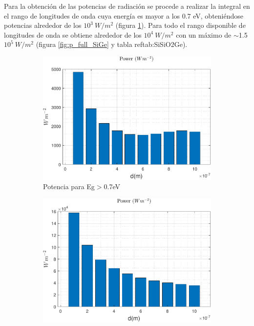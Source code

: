 Para la obtención de las potencias de radiación se procede a realizar la integral en el rango de longitudes de onda cuya energía es mayor a los 0.7 eV, obteniéndose potencias alrededor de los $10^3 \ W/m^2$ (figura \ref{fig:p_Eg_SiGe}). Para todo el rango disponible de longitudes de onda se obtiene alrededor de los $10^4 \ W/m^2$ con un máximo de $\sim$1.5$10^5 \ W/m^2$ (figura \ref{fig:p_full_SiGe} y tabla ref{tab:SiSiO2Ge}). 
\begin{figure}[H]
\centering
\begin{subfigure}[b]{0.49\textwidth}
	\centering
		\includegraphics[width=1.00\textwidth]{figuras/Resultados/radiacion/p_Eg_SiGe.pdf}
	\caption{Potencia para Eg$>$0.7eV}
	\label{fig:p_Eg_SiGe}
\end{subfigure}
\begin{subfigure}[b]{0.49\textwidth}
	\centering
		\includegraphics[width=1.00\textwidth]{figuras/Resultados/radiacion/p_full_SiGe.pdf}

\end{subfigure}
\end{figure}
